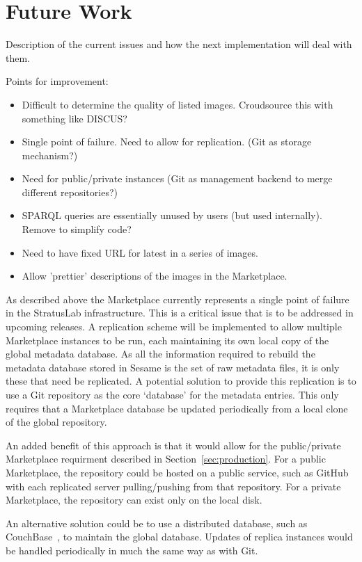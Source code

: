 \section{Future Work}

Description of the current issues and how the next implementation will
deal with them. 

Points for improvement:
\begin{itemize}
\item Difficult to determine the quality of listed images.  Croudsource
  this with something like DISCUS?
\item Single point of failure.  Need to allow for replication.  (Git as
  storage mechanism?)
\item Need for public/private instances (Git as management backend to
  merge different repositories?)
\item SPARQL queries are essentially unused by users (but used
  internally).  Remove to simplify code?
\item Need to have fixed URL for latest in a series of images.
\item Allow 'prettier' descriptions of the images in the Marketplace.
\end{itemize}

As described above the Marketplace currently represents a single point of failure in the 
StratusLab infrastructure. This is a critical issue that is to be addressed in upcoming releases. A replication scheme will be 
implemented to allow multiple Marketplace instances to be run, each maintaining its own local
copy of the global metadata database. As all the information required to rebuild the metadata database 
stored in Sesame is the set of raw metadata files, it is only these that need be replicated. A potential solution 
to provide this replication is to use a Git repository as the core `database' for the metadata entries.
This only requires that a Marketplace database be updated periodically from a local clone of the global repository. 

An added benefit of this approach is that it would allow for the public/private Marketplace requirment described in 
Section~\ref{sec:production}. For a public Marketplace, the repository could be hosted on a public service, such as GitHub~\cite{github} 
with each replicated server pulling/pushing from that repository.  For a private Marketplace, the repository can exist only on the local disk.

An alternative solution could be to use a distributed database, such as CouchBase~\cite{couchbase}, 
to maintain the global database. Updates of replica instances would be handled periodically in much the same way as with Git.


